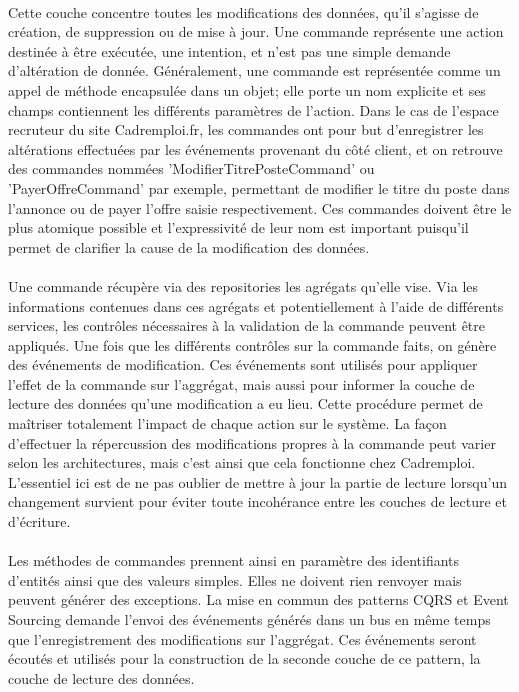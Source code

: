 \paragraph{}
Cette couche concentre toutes les modifications des données, qu'il s'agisse de création, de suppression ou de mise à jour.
Une commande représente une action destinée à être exécutée, une intention, et n'est pas une simple demande d'altération de donnée.
Généralement, une commande est représentée comme un appel de méthode encapsulée dans un objet; elle porte un nom explicite et ses champs contiennent les différents paramètres de l'action.
Dans le cas de l'espace recruteur du site Cadremploi.fr, les commandes ont pour but d'enregistrer les altérations effectuées par les événements provenant du côté client, et on retrouve des commandes nommées 'ModifierTitrePosteCommand' ou 'PayerOffreCommand' par exemple, permettant de modifier le titre du poste dans l'annonce ou de payer l'offre saisie respectivement.
Ces commandes doivent être le plus atomique possible et l'expressivité de leur nom est important puisqu'il permet de clarifier la cause de la modification des données.
\paragraph{}
Une commande récupère via des repositories les agrégats qu'elle vise.
Via les informations contenues dans ces agrégats et potentiellement à l'aide de différents services, les contrôles nécessaires à la validation de la commande peuvent être appliqués.
Une fois que les différents contrôles sur la commande faits, on génère des événements de modification.
Ces événements sont utilisés pour appliquer l'effet de la commande sur l'aggrégat, mais aussi pour informer la couche de lecture des données qu'une modification a eu lieu.
Cette procédure permet de maîtriser totalement l'impact de chaque action sur le système.
La façon d'effectuer la répercussion des modifications propres à la commande peut varier selon les architectures, mais c'est ainsi que cela fonctionne chez Cadremploi.
L'essentiel ici est de ne pas oublier de mettre à jour la partie de lecture lorsqu'un changement survient pour éviter toute incohérance entre les couches de lecture et d'écriture.
\paragraph{}
Les méthodes de commandes prennent ainsi en paramètre des identifiants d'entités ainsi que des valeurs simples.
Elles ne doivent rien renvoyer mais peuvent générer des exceptions.
La mise en commun des patterns CQRS et Event Sourcing demande l'envoi des événements générés dans un bus en même temps que l'enregistrement des modifications sur l'aggrégat.
Ces événements seront écoutés et utilisés pour la construction de la seconde couche de ce pattern, la couche de lecture des données.


